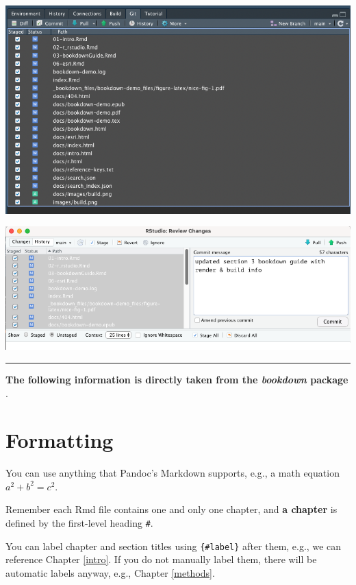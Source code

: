 \documentclass[
]{book}
\begin{document}
\begin{center}\includegraphics{images/select} \end{center}

\begin{center}\includegraphics{images/commit} \end{center}

\begin{center}\rule{0.5\linewidth}{0.5pt}\end{center}

\textbf{The following information is directly taken from the \emph{bookdown} package} \citep{R-bookdown}.

\hypertarget{formatting}{%
\section{Formatting}\label{formatting}}

You can use anything that Pandoc's Markdown supports, e.g., a math equation \(a^2 + b^2 = c^2\).

Remember each Rmd file contains one and only one chapter, and \textbf{a chapter} is defined by the first-level heading \texttt{\#}.

You can label chapter and section titles using \texttt{\{\#label\}} after them, e.g., we can reference Chapter \ref{intro}. If you do not manually label them, there will be automatic labels anyway, e.g., Chapter \ref{methods}.
\end{document}
